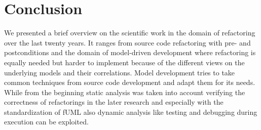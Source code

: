 \documentclass{llncs}
\begin{document}
\section{Conclusion}
\label{sec:conclusion}

We presented a brief overview on the scientific work in the domain of refactoring over the last twenty years. It ranges
from source code refactoring with pre- and postconditions and the domain of model-driven development
where refactoring is equally needed but harder to implement because of the different views on the underlying models and
their correlations. Model development tries to take common techniques from source code development and adapt them for
its needs. While from the beginning static analysis was taken into account verifying the correctness of refactorings in the later research and especially with the
standardization of fUML also dynamic analysis like testing and debugging during execution can be exploited.

\newpage


\end{document}
